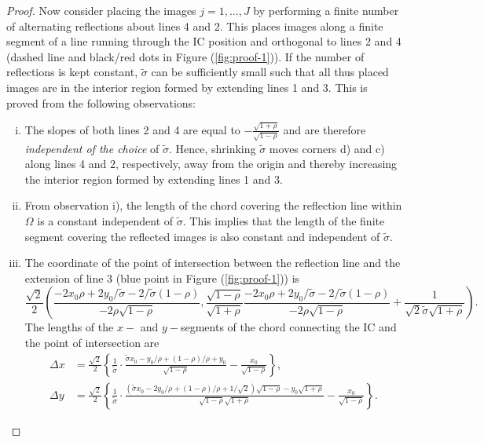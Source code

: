 \documentclass[10pt]{article}
\begin{document}
\begin{proof}
  Now consider placing the images $j = 1, \ldots, J$ by performing a
  finite number of alternating reflections about lines 4 and 2. This
  places images along a finite segment of a line running through the
  IC position and orthogonal to lines 2 and 4 (dashed line and
  black/red dots in Figure (\ref{fig:proof-1})). If the number of
  reflections is kept constant, $\tilde{\sigma}$ can be sufficiently
  small such that all thus placed images are in the interior region
  formed by extending lines 1 and 3. This is proved from the following
  observations:
  \begin{enumerate}[i)]
  \item The slopes of both lines 2 and 4 are equal to
    $-\frac{\sqrt{1+\rho}}{\sqrt{1-\rho}}$ and are therefore
    \textit{independent of the choice} of $\tilde{\sigma}$. Hence,
    shrinking $\tilde{\sigma}$ moves corners d) and c) along lines 4
    and 2, respectively, away from the origin and thereby increasing
    the interior region formed by extending lines 1 and 3.
  \item From observation i), the length of the chord covering the
    reflection line within $\Omega$ is a constant independent of
    $\tilde{\sigma}$.  This implies that the length of the finite
    segment covering the reflected images is also constant and
    independent of $\tilde{\sigma}$.
  \item The coordinate of the point of intersection between the
    reflection line and the extension of line 3 (blue point in Figure
    (\ref{fig:proof-1})) is
    \[
      \frac{\sqrt{2}}{2} \left( \frac{-2 x_0\rho + 2
          y_0/\tilde{\sigma} -
          2/\tilde{\sigma}(1-\rho)}{-2\rho\sqrt{1-\rho}},
        \frac{\sqrt{1-\rho}}{\sqrt{1+\rho}}\frac{-2 x_0\rho + 2
          y_0/\tilde{\sigma} -
          2/\tilde{\sigma}(1-\rho)}{-2\rho\sqrt{1-\rho}} +
        \frac{1}{\sqrt{2}\tilde{\sigma}\sqrt{1+\rho}} \right).
    \]
    The lengths of the $x-$ and $y-$segments of the chord connecting
    the IC and the point of intersection are
    \begin{align*}
      \Delta x &= \frac{\sqrt{2}}{2}\left\{ \frac{1}{\tilde{\sigma}}\cdot\frac{\tilde{\sigma}x_0 - y_0/\rho + (1-\rho)/\rho + y_0}{\sqrt{1-\rho}} - \frac{x_0}{\sqrt{1-\rho}} \right\},\\
      \Delta y &= \frac{\sqrt{2}}{2} \left\{ \frac{1}{\tilde{\sigma}}\cdot\frac{(\tilde{\sigma}x_0 - 2y_0/\rho + (1-\rho)/\rho + 1/\sqrt{2})\sqrt{1-\rho} - y_0\sqrt{1+\rho}}{\sqrt{1-\rho}\sqrt{1+\rho}}- \frac{x_0}{\sqrt{1-\rho}} \right\}.
    \end{align*}

\end{enumerate}
\end{proof}
\end{document}
